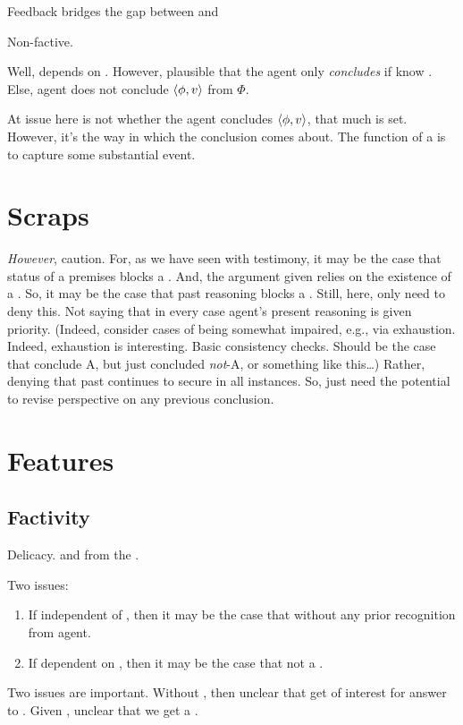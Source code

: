 \begin{note}
  Feedback bridges the gap between \agpe{} and \ros{}
\end{note}

\begin{note}
  Non-factive.

  Well, depends on \requ{}.
  However, plausible that the agent only \emph{concludes} if know \fc{}.
  Else, agent does not conclude \(\langle \phi, v \rangle\) from \(\Phi\).

  At issue here is not whether the agent concludes \(\langle \phi, v \rangle\), that much is set.
  However, it's the way in which the conclusion comes about.
  The function of a \poP{} is to capture some substantial event.
\end{note}


\section{Scraps}
\label{sec:scraps}

\begin{note}
  \emph{However}, caution.
  For, as we have seen with testimony, it may be the case that status of a premises blocks a \curb{}.
  And, the argument given relies on the existence of a \curb{}.
  So, it may be the case that past reasoning blocks a \curb{}.
  Still, here, only need to deny this.
  Not saying that in every case agent's present reasoning is given priority.
  (Indeed, consider cases of being somewhat impaired, e.g., via exhaustion.
  Indeed, exhaustion is interesting.
  Basic consistency checks.
  Should be the case that conclude A, but just concluded \emph{not}-A, or something like this\dots)
  Rather, denying that past continues to secure in all instances.
  So, just need the potential to revise perspective on any previous conclusion.
\end{note}

\section{Features}
\label{sec:features}

\subsection{Factivity}
\label{sec:factivity}

\begin{note}
  Delicacy.
   and \ros{} from the \agpe{}.

  Two issues:

  \begin{enumerate}
  \item
    If independent of \agpe{}, then it may be the case that \fc{} without any prior recognition from agent.
  \item
    If dependent on \agpe{}, then it may be the case that not a \fc{}.
  \end{enumerate}

  Two issues are important.
  Without \agpe{}, then unclear that get \ros{} of interest for answer to \qWhyV{}.
  Given \agpe{}, unclear that we get a \ros{}.
\end{note}

